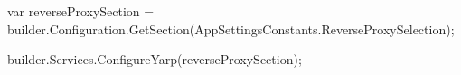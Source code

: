 \begin{spverbatim}
    var reverseProxySection = builder.Configuration.GetSection(AppSettingsConstants.ReverseProxySelection);

    builder.Services.ConfigureYarp(reverseProxySection);
\end{spverbatim}